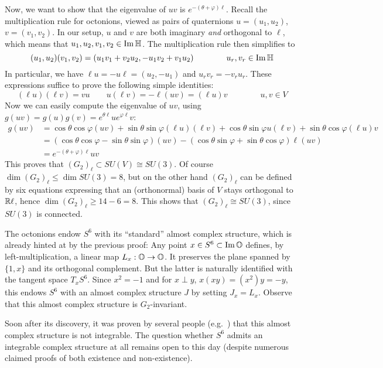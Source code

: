 \begin{myproof}
	Now, we want to show that the eigenvalue of $uv$ is $e^{-(\theta+\varphi)\ell}$. Recall the multiplication rule for octonions, viewed as pairs of quaternions $u=(u_1,u_2)$, $v=(v_1,v_2)$. In our setup, $u$ and $v$ are both imaginary \emph{and} orthogonal to $\ell$, which means that $u_1,u_2,v_1,v_2\in \operatorname{Im}\mathbb{H}$. The multiplication rule then simplifies to
	\begin{equation*}
		(u_1,u_2)(v_1,v_2)=(u_1v_1+v_2u_2,-u_1v_2+v_1u_2)
		\qquad \qquad u_r,v_r\in \operatorname{Im}\mathbb{H} 
	\end{equation*}
	In particular, we have $\ell u=-u\ell=(u_2,-u_1)$ and $u_rv_r=-v_r u_r$. These expressions suffice to prove the following simple identities:
	\begin{equation*}
		(\ell u)(\ell v)=vu \qquad u(\ell v)=-\ell(uv)=(\ell u)v \qquad \qquad u,v\in V
	\end{equation*}
	Now we can easily compute the eigenvalue of $uv$, using $g(uv)=g(u)g(v)=e^{\theta\ell}ue^{\varphi \ell}v$:
	\begin{align*}
		g(uv)&=\cos\theta\cos\varphi (uv)+\sin\theta\sin\varphi (\ell u)(\ell v)
		+\cos\theta \sin\varphi u(\ell v)+\sin\theta\cos\varphi (\ell u)v\\
		&=(\cos\theta\cos\varphi-\sin\theta\sin\varphi) (uv)-(\cos\theta\sin\varphi+\sin\theta\cos\varphi) \ell(uv)\\
		&=e^{-(\theta+\varphi)\ell}uv
	\end{align*}
	This proves that $(G_2)_\ell\subset SU(V)\cong SU(3)$. Of course $\dim (G_2)_\ell\leq \dim SU(3)=8$, but on the other hand $(G_2)_\ell$ can be defined by six equations expressing that an (orthonormal) basis of $V$ stays orthogonal to $\mathbb{R}\ell$, hence $\dim (G_2)_\ell\geq 14-6=8$. This shows that $(G_2)_\ell\cong SU(3)$, since $SU(3)$ is connected.
\end{myproof}

The octonions endow $S^6$ with its ``standard'' almost complex structure, which is already hinted at by the previous proof: Any point $x\in S^6\subset \operatorname{Im}\mathbb{O}$ defines, by left-multiplication, a linear map $L_x:\mathbb{O}\to\mathbb{O}$. It preserves the plane spanned by $\{1,x\}$ and its orthogonal complement. But the latter is naturally identified with the tangent space $T_x S^6$. Since $x^2=-1$ and for $x\perp y$, $x(xy)=(x^2)y=-y$, this endows $S^6$ with an almost complex structure $J$ by setting $J_x=L_x$. Observe that this almost complex structure is $G_2$-invariant.

Soon after its discovery, it was proven by several people (e.g.~\cite{EL1951}) that this almost complex structure is not integrable. The question whether $S^6$ admits an integrable complex structure at all remains open to this day (despite numerous claimed proofs of both existence and non-existence).

